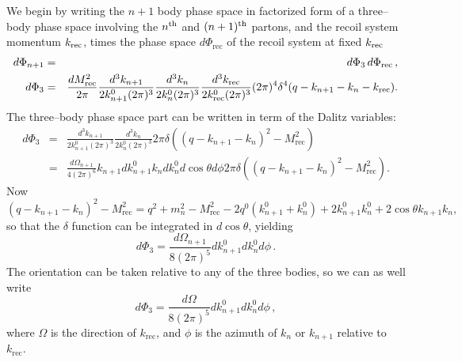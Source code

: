 \documentclass[11pt,a4paper]{article}
\newcommand{\tmop}[1]{\ensuremath{\operatorname{#1}}}
\begin{document}
We begin by writing the $n + 1$ body phase space in factorized form of a three--body 
phase space involving the $n^{\text{{\rmfamily{th}}}}$ and $(n +
1)^{\text{{\rmfamily{th}}}}$ partons, and the recoil system momentum
$k_{\text{{\rmfamily{rec}}}}$, times the phase space $d \Phi_{\tmop{rec}}$ of
the recoil system at fixed $k_{\text{{\rmfamily{rec}}}}$
\begin{eqnarray}
  d \Phi_{n+1}&=& d \Phi_3 \,d\Phi_{\rm rec}\,, \label{eq:np1fact} \\
  d \Phi_3 &=& \frac{dM_{\tmop{rec}}^2}{2 \pi} \frac{d^3 k_{n + 1}}{2 k_{n
  + 1}^0 (2 \pi)^3} \frac{d^3 k_n}{2 k_n^0 (2 \pi)^3} \frac{d^3
  k_{\tmop{rec}}}{2 k_{\tmop{rec}}^0 (2 \pi)^3} (2 \pi)^4 \delta^4 (q - k_{n +
  1} - k_n - k_{\tmop{rec}}) .
\end{eqnarray}
The three--body phase space part can be written in term of the Dalitz variables:
\begin{eqnarray}
 d \Phi_3 &=& 
 \frac{d^3 k_{n + 1}}{2 k_{n + 1}^0 (2 \pi)^3} \frac{d^3 k_n}{2 k_n^0 (2
   \pi)^3} 2 \pi \delta ((q - k_{n + 1} - k_n)^2 - M_{\tmop{rec}}^2)\nonumber \\
 &=& \frac{d \Omega_{n + 1}}{4 (2 \pi)^6} k_{n + 1} dk_{n + 1}^0 k_n dk_n^0 d
   \cos\theta d \phi 2 \pi \delta ((q - k_{n + 1} - k_n)^2 -
   M_{\tmop{rec}}^2) .
\end{eqnarray}
Now
\[ (q - k_{n + 1} - k_n)^2 - M_{\tmop{rec}}^2 = q^2 + m_n^2 - M_{\tmop{rec}}^2
   - 2 q^0 (k_{n + 1}^0 + k_n^0) + 2 k_{n + 1}^0 k_n^0 + 2 \cos \theta k_{n +
   1} k_n, \]
so that the $\delta$ function can be integrated in $d\cos\theta$,
yielding
\begin{equation}
  d \Phi_3 = \frac{d \Omega_{n + 1}}{8 (2 \pi)^5} dk_{n + 1}^0 dk_n^0 d \phi \, .
\end{equation}
The orientation can be taken relative to any of the three bodies, so we can
as well write
\begin{equation}
  d \Phi_3 = \frac{d \Omega}{8 (2 \pi)^5} dk_{n + 1}^0 dk_n^0 d \phi \, ,
\end{equation}
where $\Omega$ is the direction of $k_{\tmop{rec}}$, and $\phi$ is the azimuth
of $k_n$ or $k_{n + 1}$ relative to $k_{\tmop{rec}}$.
\end{document}
